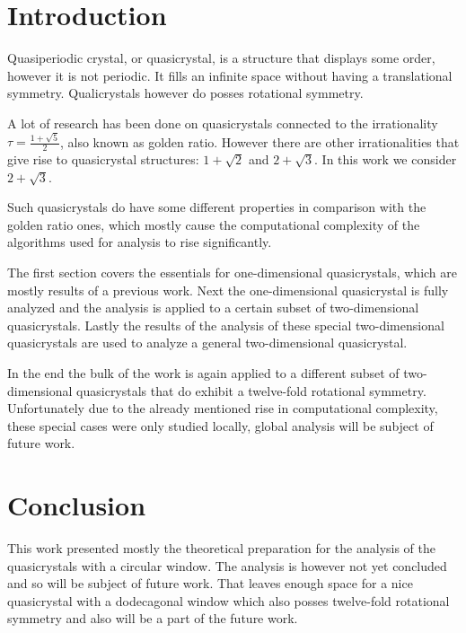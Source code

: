 \documentclass[a4paper,10pt,twoside]{article}
\theoremstyle{definition}
\theoremstyle{remark}
\begin{document}
\section*{Introduction}
Quasiperiodic crystal, or quasicrystal, is a structure that displays some order, however it is not periodic. It fills an infinite space without having a translational symmetry. Qualicrystals however do posses rotational symmetry. 

A lot of research \cite{classification,classificationII,classificationIII} has been done on quasicrystals connected to the irrationality $\tau = \frac{1+\sqrt{5}}{2}$, also known as golden ratio. However there are other irrationalities that give rise to quasicrystal structures: $1+\sqrt{2}$ and $2+\sqrt{3}$. In this work we consider $2+\sqrt{3}$.

Such quasicrystals do have some different properties in comparison with the golden ratio ones, which mostly cause the computational complexity of the algorithms used for analysis to rise significantly. 

The first section covers the essentials for one-dimensional quasicrystals, which are mostly results of a previous work. Next the one-dimensional quasicrystal is fully analyzed and the analysis is applied to a certain subset of two-dimensional quasicrystals. Lastly the results of the analysis of these special two-dimensional quasicrystals are used to analyze a general two-dimensional quasicrystal. 

In the end the bulk of the work is again applied to a different subset of two-dimensional quasicrystals that do exhibit a twelve-fold rotational symmetry. Unfortunately due to the already mentioned rise in computational complexity, these special cases were only studied locally, global analysis will be subject of future work. 
\cleardoublepage
\pagestyle{plain}

\clearpage

\clearpage

\clearpage

\clearpage

\clearpage

\cleardoublepage

\clearpage

\clearpage


\clearpage


\clearpage
\pagestyle{empty}
\section*{Conclusion}
This work presented mostly the theoretical preparation for the analysis of the quasicrystals with a circular window. The analysis is however not yet concluded and so will be subject of future work. That leaves enough space for a nice quasicrystal with a dodecagonal window which also posses twelve-fold rotational symmetry and also will be a part of the future work. 
\end{document}
